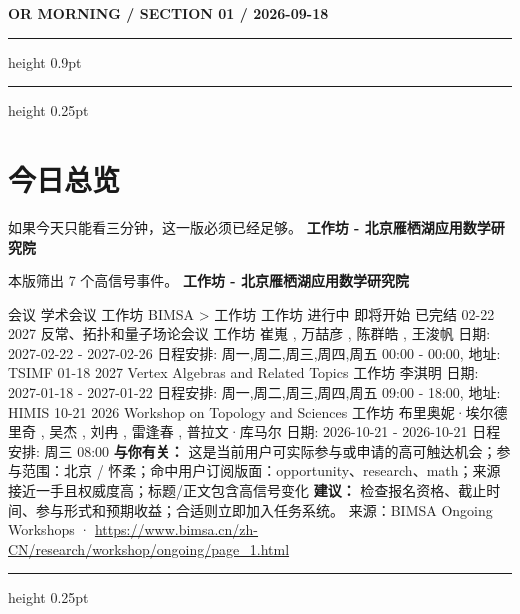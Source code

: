 \documentclass[10.5pt]{ctexart}
\begin{document}
{\small\bfseries OR MORNING / SECTION 01 / 2026-09-18}
\vspace{2mm}
\hrule height 0.9pt
\vspace{1.5mm}
\hrule height 0.25pt
\vspace{4mm}
\section*{今日总览}
{\color{ormuted} 如果今天只能看三分钟，这一版必须已经足够。}
\vspace{2mm}
{\fontsize{25}{29}\selectfont\bfseries 工作坊 - 北京雁栖湖应用数学研究院}\par
\vspace{2mm}
{\large 本版筛出 7 个高信号事件。}
\vspace{3mm}
{\Large\bfseries 工作坊 - 北京雁栖湖应用数学研究院}\par
会议 学术会议 工作坊 BIMSA > 工作坊 工作坊 进行中 即将开始 已完结 02-22 2027 反常、拓扑和量子场论会议 工作坊 崔嵬 , 万喆彦 , 陈群皓 , 王浚帆 日期: 2027-02-22 - 2027-02-26 日程安排: 周一,周二,周三,周四,周五 00:00 - 00:00, 地址: TSIMF 01-18 2027 Vertex Algebras and Related Topics 工作坊 李淇明 日期: 2027-01-18 - 2027-01-22 日程安排: 周一,周二,周三,周四,周五 09:00 - 18:00, 地址: HIMIS 10-21 2026 Workshop on Topology and Sciences 工作坊 布里奥妮·埃尔德里奇 , 吴杰 , 刘冉 , 雷逢春 , 普拉文·库马尔 日期: 2026-10-21 - 2026-10-21 日程安排: 周三 08:00
\textbf{与你有关：} 这是当前用户可实际参与或申请的高可触达机会；参与范围：北京 / 怀柔；命中用户订阅版面：opportunity、research、math；来源接近一手且权威度高；标题/正文包含高信号变化
\textbf{建议：} 检查报名资格、截止时间、参与形式和预期收益；合适则立即加入任务系统。
{\footnotesize\color{ormuted} 来源：BIMSA Ongoing Workshops · \url{https://www.bimsa.cn/zh-CN/research/workshop/ongoing/page_1.html}}
\vspace{3mm}
\hrule height 0.25pt
\vspace{3mm}
\end{document}
